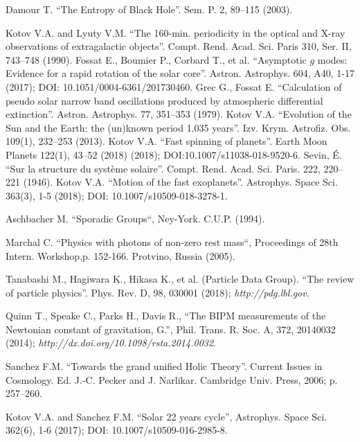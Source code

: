\documentclass[twoside,draft]{article}
\begin{document}
\begin{sloppypar}
\begin{thebibliography}{99}
 Damour T. ``The Entropy of Black Hole''. Sem. P. 2, 89--115 (2003).

 Kotov V.A. and Lyuty V.M. ``The 160-min. periodicity in the optical
and X-ray observations of extragalactic objects''. Compt. Rend. Acad. Sci.
Paris 310, Ser. II, 743--748 (1990). Fossat E., Boumier P., Corbard T., et al.
``Asymptotic $g$ modes: Evidence for a rapid rotation of the solar core''.
Astron. Astrophys. 604, A40, 1-17 (2017); DOI: 10.1051/0004-6361/201730460.
Grec G., Fossat E. ``Calculation of pseudo solar narrow band oscillations
produced by atmospheric differential extinction''. Astron. Astrophys. 77,
351--353 (1979). Kotov V.A. ``Evolution of the Sun and the Earth: the (un)known
period 1.035 years''. Izv. Krym. Astrofiz. Obs. 109(1), 232--253 (2013).
Kotov V.A. ``Fast spinning of planets''. Earth Moon Planets 122(1), 43--52
(2018) (2018); DOI:10.1007/s11038-018-9520-6. Sevin, \'E. ``Sur la structure du
syst\`eme solaire''. Compt. Rend. Acad. Sci. Paris. 222, 220--221 (1946).
Kotov V.A. ``Motion of the fast exoplanets''. Astrophys. Space Sci. 363(3), 1-5
(2018); DOI: 10.1007/s10509-018-3278-1.

 Aschbacher M. ``Sporadic Groups``, Ney-York. C.U.P. (1994).

 Marchal C. ``Physics with photons of non-zero rest mass``, Proceedings of 28th Intern. Workshop,p. 152-166. Protvino, Russia (2005).


 Tanabashi M., Hagiwara K., Hikasa K., et al. (Particle Data
Group). ``The review of particle physics''. Phys. Rev. D, 98, 030001 (2018);
{\it http://pdg.lbl.gov.}

 Quinn T., Speake C., Parks H., Davis R., ``The BIPM measurements
of the Newtonian constant of gravitation, G.'', Phil. Trans. R. Soc. A, 372,
20140032 (2014); {\it http://dx.doi.org/10.1098/rsta.2014.0032}.

 Sanchez F.M. ``Towards the grand unified Holic Theory''. Current
Issues in Cosmology. Ed. J.-C. Pecker and J. Narlikar. Cambridge Univ. Press,
2006; p. 257--260.

 Kotov V.A. and Sanchez F.M. ``Solar 22 years cycle'', Astrophys.
Space Sci. 362(6), 1-6 (2017); DOI: 10.1007/s10509-016-2985-8.


\end{thebibliography}
\end{sloppypar}
\end{document}
